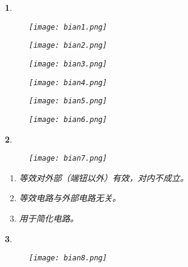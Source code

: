 \documentclass[UTF8]{report}
\theoremstyle{MyLineTheoremStyle} %
\theoremstyle{MyBlockTheoremStyle} %
\theoremstyle{MySubsubsectionStyle} %
\newtheorem{definition}{}
\begin{document}
\begin{definition}

    \begin{figure}[H]
        \centering
        \texttt{[image: bian1.png]}
    \end{figure}
    
    \begin{figure}[H]
        \centering
        \texttt{[image: bian2.png]}
    \end{figure}
    
    \begin{figure}[H]
        \centering
        \texttt{[image: bian3.png]}
    \end{figure}
    
    \begin{figure}[H]
        \centering
        \texttt{[image: bian4.png]}
    \end{figure}
    
    \begin{figure}[H]
        \centering
        \texttt{[image: bian5.png]}
    \end{figure}
    
    \begin{figure}[H]
        \centering
        \texttt{[image: bian6.png]}
    \end{figure}
    
\end{definition}

\begin{definition}
    \begin{figure}[H]
        \centering
        \texttt{[image: bian7.png]}
    \end{figure}

    \begin{enumerate}[left=0pt]
        \textbf{\textcolor{red}{Attention}}
        \item 等效对外部（端钮以外）有效，对内不成立。
        \item 等效电路与外部电路无关。
        \item 用于简化电路。
    \end{enumerate}
\end{definition}

\cleardoublepage

\begin{definition}
    \begin{figure}[H]
        \centering
        \texttt{[image: bian8.png]}
    \end{figure}
\end{definition}
\end{document}
